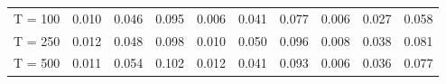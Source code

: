 % 
\begin{tabular}{cccccccccc}
  \hline
  \hline
T = 100 & 0.010 & 0.046 & 0.095 & 0.006 & 0.041 & 0.077 & 0.006 & 0.027 & 0.058 \\ 
  T = 250 & 0.012 & 0.048 & 0.098 & 0.010 & 0.050 & 0.096 & 0.008 & 0.038 & 0.081 \\ 
  T = 500 & 0.011 & 0.054 & 0.102 & 0.012 & 0.041 & 0.093 & 0.006 & 0.036 & 0.077 \\ 
   \hline
\end{tabular}
